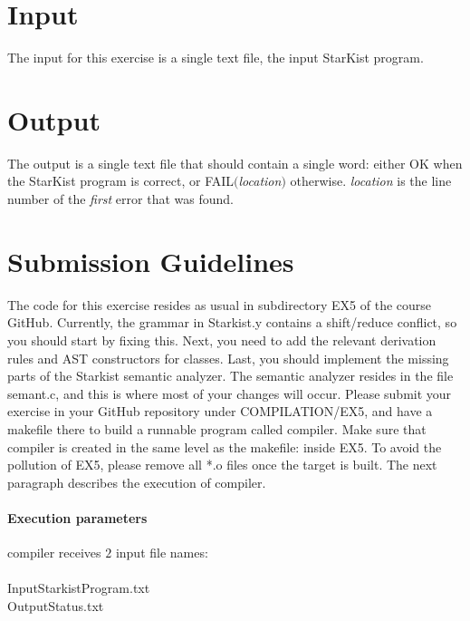 \documentclass{article}
\begin{document}
\section{Input}
The input for this exercise is a single text file, the input StarKist program.

\section{Output}
The output is a single text file that should contain a single word:
either OK when the StarKist program is correct, or FAIL$($\textit{location}$)$ otherwise.
\textit{location} is the line number of the \textit{first} error that was found.

\section{Submission Guidelines}
The code for this exercise resides as usual in subdirectory EX5 of the course GitHub.
Currently, the grammar in Starkist.y contains a shift/reduce conflict,
so you should start by fixing this.
Next, you need to add the relevant derivation rules and AST constructors
for classes. Last, you should implement the missing parts of the Starkist semantic analyzer.
The semantic analyzer resides in the file semant.c, and this is where
most of your changes will occur.
Please submit your exercise in your GitHub repository under COMPILATION/EX5,
and have a makefile there to build a runnable program called compiler.
Make sure that compiler is created in the same level as the makefile: inside EX5.
To avoid the pollution of EX5, please remove all *.o files once the target is built.
The next paragraph describes the execution of compiler.

\paragraph{Execution parameters}
compiler receives $2$ input file names:\\ \\
InputStarkistProgram.txt\\
OutputStatus.txt
\end{document}
